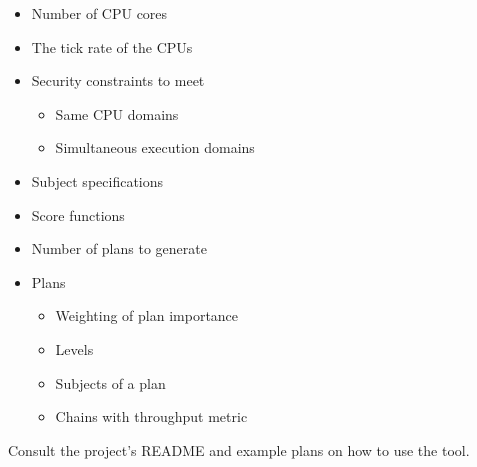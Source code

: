 \documentclass[a4paper,twoside,titlepage]{article}
\begin{document}
\begin{itemize}
	\item Number of CPU cores
	\item The tick rate of the CPUs
	\item Security constraints to meet
	\begin{itemize}
		\item Same CPU domains
		\item Simultaneous execution domains
	\end{itemize}
	\item Subject specifications
	\item Score functions
	\item Number of plans to generate
	\item Plans
	\begin{itemize}
		\item Weighting of plan importance
		\item Levels
		\item Subjects of a plan
		\item Chains with throughput metric
	\end{itemize}
\end{itemize}

Consult the project's README and example plans on how to use the tool.
\end{document}
